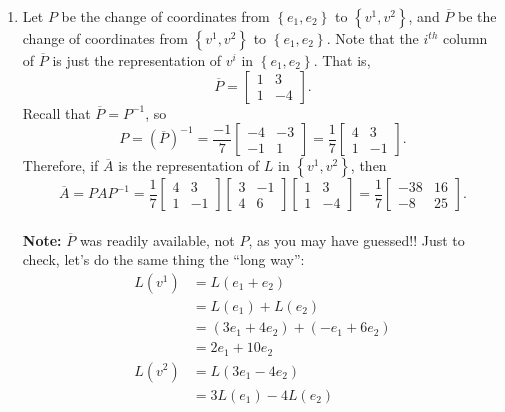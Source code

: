 \begin{enumerate}
\item Let $P$ be the change of coordinates from $\left\{ e_{1},e_{2}\right\} $
to $\left\{ v^{1},v^{2}\right\} $, and $\overline{P}$ be the change of
coordinates from $\left\{ v^{1},v^{2}\right\} $ to $\left\{ e_{1},e_{2}\right\} $.
Note that the $i^{th}$ column of $\overline{P}$ is just the representation
of $v^{i}$ in $\left\{ e_{1},e_{2}\right\} $. That is,
\[\overline{P}=\begin{bmatrix}1 & 3\\
1 & -4
\end{bmatrix}.\]
Recall that $\overline{P}=P^{-1}$, so
\[P=\left(\overline{P}\right)^{-1}=\frac{-1}{7}\begin{bmatrix}-4 & -3\\
-1 & 1
\end{bmatrix}=\frac{1}{7}\begin{bmatrix}4 & 3\\
1 & -1
\end{bmatrix}.\]
Therefore, if $\overline{A}$ is the representation of $L$ in $\left\{ v^{1},v^{2}\right\} $,
then
\[\overline{A}=PAP^{-1}=\frac{1}{7}\begin{bmatrix}4 & 3\\
1 & -1
\end{bmatrix}\begin{bmatrix}3 & -1\\
4 & 6
\end{bmatrix}\begin{bmatrix}1 & 3\\
1 & -4
\end{bmatrix}=\frac{1}{7}\begin{bmatrix}-38 & 16\\
-8 & 25
\end{bmatrix}.\]\\
\textbf{Note:} $\overline{P}$ was readily available, not $P$,
as you may have guessed!! Just to check, let's do the same thing the ``long way'':\\
\begin{align*}
L\left(v^{1}\right) & =L\left(e_{1}+e_{2}\right)\\
 & =L\left(e_{1}\right)+L\left(e_{2}\right)\\
 & =\left(3e_{1}+4e_{2}\right)+\left(-e_{1}+6e_{2}\right)\\
 & =2e_{1}+10e_{2}\\
L\left(v^{2}\right) & =L\left(3e_{1}-4e_{2}\right)\\
 & =3L\left(e_{1}\right)-4L\left(e_{2}\right)\\

\end{align*}
\end{enumerate}

